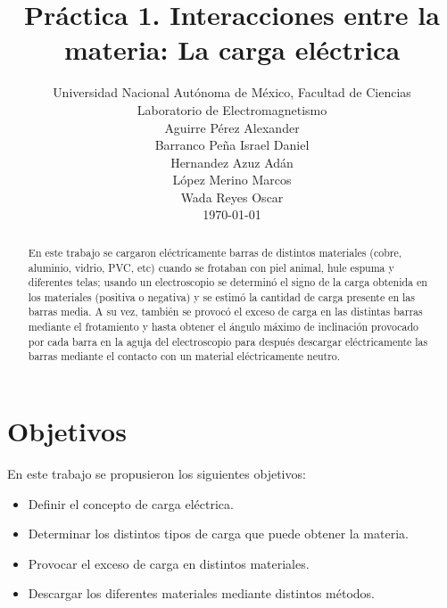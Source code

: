 \documentclass[10pt,journal]{IEEEtran}
\begin{document}
\title{\textbf{Práctica 1.} Interacciones entre la materia: La carga eléctrica}
\author{Universidad Nacional Autónoma de México, Facultad de Ciencias\\ Laboratorio de Electromagnetismo\\
Aguirre Pérez Alexander\\ Barranco Peña Israel Daniel\\  Hernandez Azuz Adán\\ López Merino Marcos\\ Wada Reyes Oscar\\ \today }
\maketitle{}  
\begin{abstract}
En este trabajo se cargaron eléctricamente barras de distintos materiales (cobre, aluminio, vidrio, PVC, etc) cuando se frotaban con piel animal, hule espuma y diferentes telas; usando un electroscopio se determinó el signo de la carga obtenida en los materiales (positiva o negativa) y se estimó la cantidad de
carga presente en las barras media. A su vez, también se provocó el exceso de carga en las distintas barras mediante el frotamiento y hasta obtener el ángulo máximo de inclinación provocado por cada barra en la aguja del electroscopio para después descargar eléctricamente las barras mediante el contacto con un material eléctricamente neutro.
\end{abstract}
\section{Objetivos}
En este trabajo se propusieron los siguientes objetivos:
\begin{itemize}
    \item Definir el concepto de carga eléctrica.
    \item Determinar los distintos tipos de carga que puede obtener la materia.
    \item Provocar el exceso de carga en distintos materiales.
    \item Descargar los diferentes materiales mediante distintos métodos.
\end{itemize}
\end{document}
